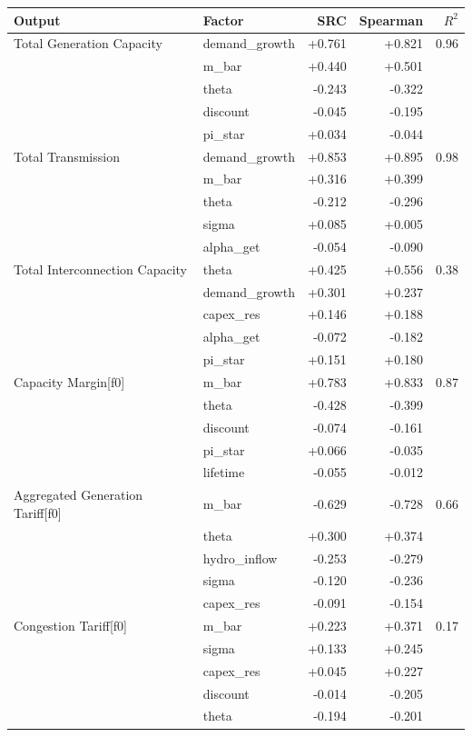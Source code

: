 \begin{tabular}{@{}llrrr@{}}
\toprule
Output & Factor & SRC & Spearman & $R^2$\\
\midrule
Total Generation Capacity & demand_growth & +0.761 & +0.821 & 0.96\\
 & m_bar & +0.440 & +0.501 & \\
 & theta & -0.243 & -0.322 & \\
 & discount & -0.045 & -0.195 & \\
 & pi_star & +0.034 & -0.044 & \\
\addlinespace
Total Transmission & demand_growth & +0.853 & +0.895 & 0.98\\
 & m_bar & +0.316 & +0.399 & \\
 & theta & -0.212 & -0.296 & \\
 & sigma & +0.085 & +0.005 & \\
 & alpha_get & -0.054 & -0.090 & \\
\addlinespace
Total Interconnection Capacity & theta & +0.425 & +0.556 & 0.38\\
 & demand_growth & +0.301 & +0.237 & \\
 & capex_res & +0.146 & +0.188 & \\
 & alpha_get & -0.072 & -0.182 & \\
 & pi_star & +0.151 & +0.180 & \\
\addlinespace
Capacity Margin[f0] & m_bar & +0.783 & +0.833 & 0.87\\
 & theta & -0.428 & -0.399 & \\
 & discount & -0.074 & -0.161 & \\
 & pi_star & +0.066 & -0.035 & \\
 & lifetime & -0.055 & -0.012 & \\
\addlinespace
Aggregated Generation Tariff[f0] & m_bar & -0.629 & -0.728 & 0.66\\
 & theta & +0.300 & +0.374 & \\
 & hydro_inflow & -0.253 & -0.279 & \\
 & sigma & -0.120 & -0.236 & \\
 & capex_res & -0.091 & -0.154 & \\
\addlinespace
Congestion Tariff[f0] & m_bar & +0.223 & +0.371 & 0.17\\
 & sigma & +0.133 & +0.245 & \\
 & capex_res & +0.045 & +0.227 & \\
 & discount & -0.014 & -0.205 & \\
 & theta & -0.194 & -0.201 & \\

\end{tabular}
